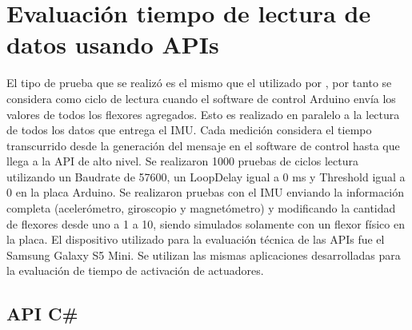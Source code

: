 \section{Evaluación tiempo de lectura de datos usando APIs}
El tipo de prueba que se realizó es el mismo que el utilizado por \cite{tesis-cerda-rodrigo}, por tanto se considera como ciclo de lectura cuando el software de control Arduino envía los valores de todos los flexores agregados. Esto es realizado en paralelo a la lectura de todos los datos que entrega el IMU. Cada medición considera el tiempo transcurrido desde la generación del mensaje en el software de control hasta que llega a la API de alto nivel. Se realizaron 1000 pruebas de ciclos lectura utilizando un Baudrate de 57600, un LoopDelay igual a 0 ms y Threshold igual a 0 en la placa Arduino. Se realizaron pruebas con el IMU enviando la información completa (acelerómetro, giroscopio y magnetómetro) y modificando la cantidad de flexores desde uno a 1 a 10, siendo simulados solamente con un flexor físico en la placa. El dispositivo utilizado para la evaluación técnica de las APIs fue el Samsung Galaxy S5 Mini. Se utilizan las mismas aplicaciones desarrolladas para la evaluación de tiempo de activación de actuadores.

\subsection{API C\#}


